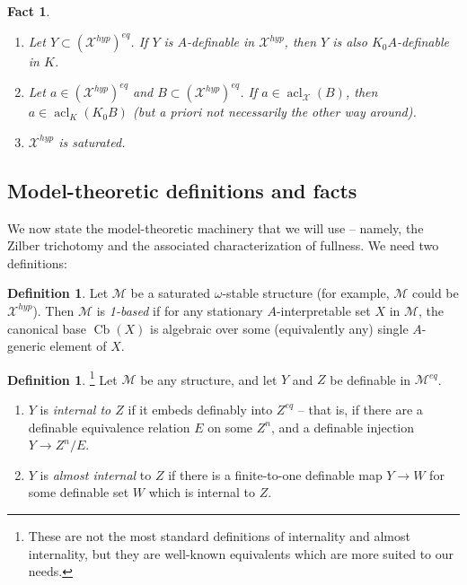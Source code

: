 \documentclass{amsart}
\newtheorem{fact}[theorem]{Fact}
\theoremstyle{definition}
\newtheorem{definition}[theorem]{Definition}
\newcommand{\acl}{\operatorname{acl}}
\begin{document}
\begin{fact}\label{F: relic acl}
    \begin{enumerate}
        \item Let $Y\subset(\mathcal X^{hyp})^{eq}$. If $Y$ is $A$-definable in $\mathcal X^{hyp}$, then $Y$ is also $K_0A$-definable in $K$.
        \item Let $a\in(\mathcal X^{hyp})^{eq}$ and $B\subset(\mathcal X^{hyp})^{eq}$. If $a\in\acl_{\mathcal X}(B)$, then $a\in\acl_{K}(K_0B)$ (but a priori not necessarily the other way around).
        \item $\mathcal X^{hyp}$ is saturated.
    \end{enumerate}
\end{fact}

\subsection{Model-theoretic definitions and facts}

We now state the model-theoretic machinery that we will use -- namely, the Zilber trichotomy and the associated characterization of fullness. We need two definitions:

\begin{definition}\label{D: 1-based}
    Let $\mathcal M$ be a saturated $\omega$-stable structure (for example, $\mathcal M$ could be $\mathcal X^{hyp}$). Then $\mathcal M$ is \textit{1-based} if for any stationary $A$-interpretable set $X$ in $\mathcal M$, the canonical base $\operatorname{Cb}(X)$ is algebraic over some (equivalently any) single $A$-generic element of $X$. 
\end{definition}

\begin{definition}\footnote{These are not the most standard definitions of internality and almost internality, but they are well-known equivalents which are more suited to our needs.}
    Let $\mathcal M$ be any structure, and let $Y$ and $Z$ be definable in $\mathcal M^{eq}$. 
    \begin{enumerate}
        \item $Y$ is \textit{internal to $Z$} if it embeds definably into $Z^{eq}$ -- that is, if there are a definable equivalence relation $E$ on some $Z^n$, and a definable injection $Y\rightarrow Z^n/E$.
        \item $Y$ is \textit{almost internal} to $Z$ if there is a finite-to-one definable map $Y\rightarrow W$ for some definable set $W$ which is internal to $Z$.
    \end{enumerate}
\end{definition}
\end{document}
